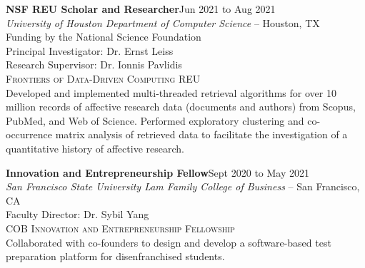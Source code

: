 \documentclass[hidelinks, 10pt]{article}
\begin{document}
{{    \begin{minipage}[ct]{0.9\linewidth}
        \textbf{NSF REU Scholar and Researcher}\hfill Jun 2021 to Aug 2021\\
        \emph{University of Houston Department of Computer Science} -- Houston, TX\\
        Funding by the National Science Foundation\\
        Principal Investigator: Dr. Ernst Leiss\\
        Research Supervisor: Dr. Ionnis Pavlidis\\
        {\textsc{Frontiers of Data-Driven Computing REU}}
        \vspace{1mm}\\
        Developed and implemented multi-threaded retrieval algorithms for over 10 million
        records of affective research data (documents and authors) from Scopus, PubMed,
        and Web of Science. Performed exploratory clustering and co-occurrence matrix
        analysis of retrieved data to facilitate the investigation of a quantitative history of
        affective research.
    \end{minipage}

    \vspace{4mm}

    \begin{minipage}[ct]{0.9\linewidth}
        \textbf{Innovation and Entrepreneurship Fellow}\hfill Sept 2020 to May 2021\\
        \emph{San Francisco State University Lam Family College of Business} -- San Francisco, CA\\
        Faculty Director: Dr. Sybil Yang\\
        {\textsc{COB Innovation and Entrepreneurship Fellowship}}
        \vspace{1mm}\\
        Collaborated with co-founders to design and develop a software-based test
        preparation platform for disenfranchised students.
    \end{minipage}

}}
\end{document}
